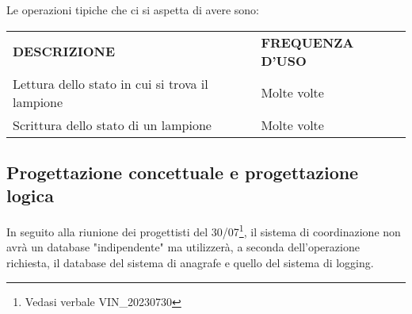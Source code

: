 Le operazioni tipiche che ci si aspetta di avere sono:

\begin{center}
    \begin{tabularx}{\textwidth}{|l|X|}
        \hline
        \rowcolor{gray!30}
        \multicolumn{2}{|c|}{\textbf{OPERAZIONI TIPICHE}}
        \\
        \hline
        \rowcolor{gray!30}
        \textbf{{DESCRIZIONE}} & \textbf{{FREQUENZA D'USO}} \\
        \hline
        Lettura dello stato in cui si trova il lampione & Molte volte \\
        \hline
        Scrittura dello stato di un lampione & Molte volte\\
        \hline
    \end{tabularx}
\end{center}

\subsection{Progettazione concettuale e progettazione logica}

In seguito alla riunione dei progettisti del 30/07\footnote{Vedasi verbale VIN\_20230730}, il sistema di coordinazione non avrà un database "indipendente" ma utilizzerà, a seconda dell'operazione richiesta, il database del sistema di anagrafe e quello del sistema di logging.